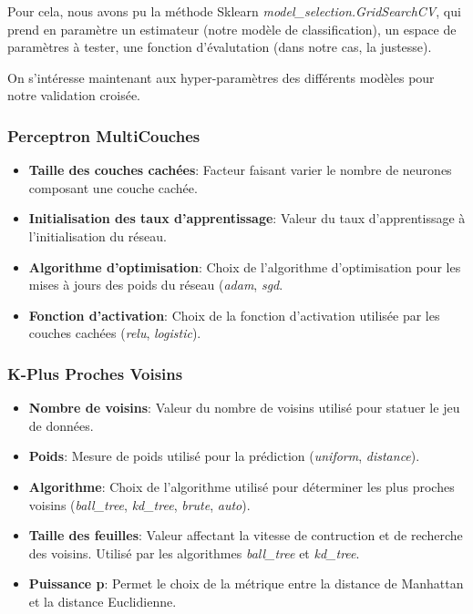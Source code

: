 Pour cela, nous avons pu la méthode Sklearn \emph{model\_selection.GridSearchCV}, qui prend en paramètre un estimateur (notre modèle de classification), un espace de paramètres à tester, une fonction d'évalutation (dans notre cas, la justesse).

On s'intéresse maintenant aux hyper-paramètres des différents modèles pour notre validation croisée. 

\subsubsection*{Perceptron MultiCouches}
\begin{itemize}
	\item \textbf{Taille des couches cachées}: Facteur faisant varier le nombre de neurones composant une couche cachée.
	\item \textbf{Initialisation des taux d'apprentissage}: Valeur du taux d'apprentissage à l'initialisation du réseau. 
	\item \textbf{Algorithme d'optimisation}: Choix de l'algorithme d'optimisation pour les mises à jours des poids du réseau (\emph{adam}, \emph{sgd}.
	\item \textbf{Fonction d'activation}: Choix de la fonction d'activation utilisée par les couches cachées (\emph{relu}, \emph{logistic}).
\end{itemize}

\subsubsection*{K-Plus Proches Voisins}
\begin{itemize}
	\item \textbf{Nombre de voisins}: Valeur du nombre de voisins utilisé pour statuer le jeu de données.
	\item \textbf{Poids}: Mesure de poids utilisé pour la prédiction (\emph{uniform}, \emph{distance}). 
	\item \textbf{Algorithme}: Choix de l'algorithme utilisé pour déterminer les plus proches voisins (\emph{ball\_tree}, \emph{kd\_tree}, \emph{brute}, \emph{auto}).
	\item \textbf{Taille des feuilles}: Valeur affectant la vitesse de contruction et de recherche des voisins. Utilisé par les algorithmes \emph{ball\_tree} et \emph{kd\_tree}.
	\item \textbf{Puissance p}: Permet le choix de la métrique entre la distance de Manhattan et la distance Euclidienne.
\end{itemize}

